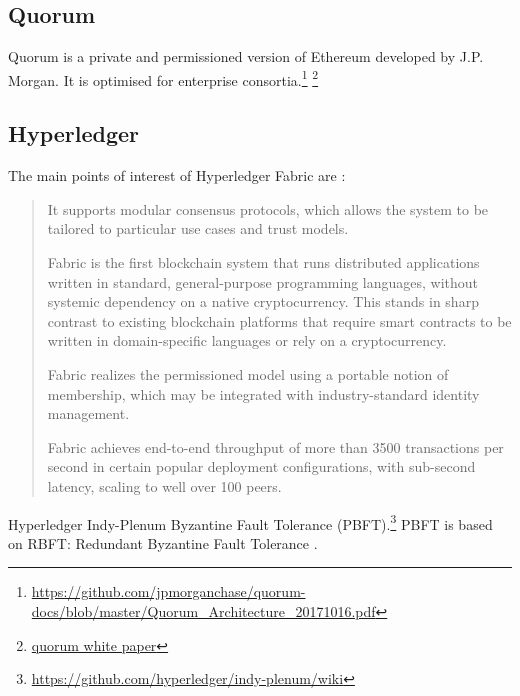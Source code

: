 \subsection{Quorum}
Quorum is a private and permissioned version of Ethereum developed by J.P. Morgan. It is optimised for enterprise consortia.\footnote{\url{https://github.com/jpmorganchase/quorum-docs/blob/master/Quorum_Architecture_20171016.pdf}} \footnote{\url{quorum white paper}}




\subsection{Hyperledger}
The main points of interest of Hyperledger Fabric are \cite{AndroulakiEtAl2018}:


\begin{quote}
\begin{packed_item1}
\item It supports modular consensus protocols, which allows the system to be tailored to particular use cases and trust models.
\item Fabric is the first blockchain system that runs distributed applications written in standard, general-purpose programming languages, without systemic dependency on a native cryptocurrency. This stands in sharp contrast to existing blockchain platforms that require smart contracts to be written in domain-specific languages or rely on a cryptocurrency.
\item Fabric realizes the permissioned model using a portable notion of membership, which may be integrated with industry-standard identity management.
\item Fabric achieves end-to-end throughput of more than 3500 transactions per second in certain popular deployment configurations, with sub-second latency, scaling to well over 100 peers.
\end{packed_item1}
\end{quote}



Hyperledger Indy-Plenum Byzantine Fault Tolerance (PBFT).\footnote{\url{https://github.com/hyperledger/indy-plenum/wiki}} PBFT is based on RBFT: Redundant Byzantine Fault Tolerance
\cite{Aublinetal2013}.



